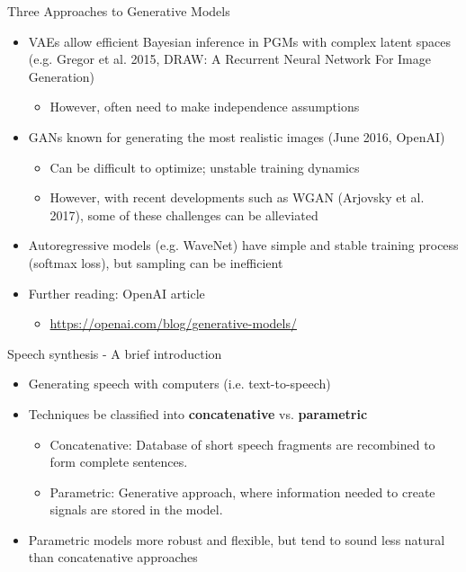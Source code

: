\documentclass{beamer}
\begin{document}
  \begin{frame}{Three Approaches to Generative Models}
    \begin{itemize}
      \item VAEs allow efficient Bayesian inference in PGMs with complex latent spaces (e.g. Gregor et al. 2015, DRAW: A Recurrent Neural Network For Image Generation)

        \begin{itemize}
          \item However, often need to make independence assumptions
        \end{itemize}
      \item GANs known for generating the most realistic images (June 2016, OpenAI)
        \begin{itemize}
          \item Can be difficult to optimize; unstable training dynamics
          \item However, with recent developments such as WGAN (Arjovsky et al. 2017), some of these challenges can be alleviated
        \end{itemize}
      \item Autoregressive models (e.g. WaveNet) have simple and stable training process (softmax loss), but sampling can be inefficient
      \item Further reading: OpenAI article
        \begin{itemize}
          \item \url{https://openai.com/blog/generative-models/}
        \end{itemize}
    \end{itemize}
  \end{frame}

  \begin{frame}{Speech synthesis - A brief introduction}
    \begin{itemize}
      \item Generating speech with computers (i.e. text-to-speech)
      \item Techniques be classified into \textbf{concatenative} vs. \textbf{parametric}
        \begin{itemize}
          \item Concatenative: Database of short speech fragments are recombined to form complete sentences.
          \item Parametric: Generative approach, where information needed to create signals are stored in the model.
        \end{itemize}
      \item Parametric models more robust and flexible, but tend to sound less natural than concatenative approaches
    \end{itemize}
  \end{frame}
\end{document}
